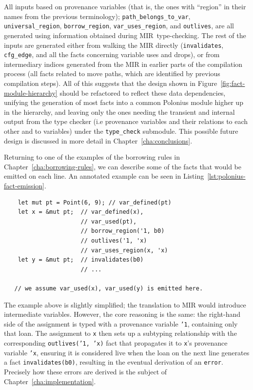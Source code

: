 \documentclass[11pt,a4paper,twoside,openany]{report}
\newenvironment{sourcecode}{\captionsetup{type=listing}}{}
\newcommand{\InRust}[1]{\texttt{#1}}
\newcommand{\InDatalog}[1]{\texttt{#1}}
\begin{document}
All inputs based on provenance variables (that is, the ones with ``region'' in
their names from the previous terminology); \texttt{path\_belongs\_to\_var},
\texttt{universal\_region}, \texttt{borrow\_region}, \texttt{var\_uses\_region},
and \texttt{outlives}, are all generated using information obtained during
MIR~type-checking. The rest of the inputs are generated either from walking the
MIR directly (\texttt{invalidates}, \texttt{cfg\_edge}, and all the facts
concerning variable uses and drops), or from intermediary indices generated from
the MIR in earlier parts of the compilation process (all facts related to move
paths, which are identified by previous compilation steps). All of this suggests
that the design shown in Figure~\ref{fig:fact-module-hierarchy} should be
refactored to reflect these data dependencies, unifying the generation of most
facts into a common Polonius module higher up in the hierarchy, and leaving only
the ones needing the transient and internal output from the type checker (i.e
provenance variables and their relations to each other and to variables) under
the \texttt{type\_check} submodule. This possible future design is discussed in
more detail in Chapter~\ref{cha:conclusions}.

Returning to one of the examples of the borrowing rules in
Chapter~\ref{cha:borrowing-rules}, we can describe some of the facts that would
be emitted on each line. An annotated example can be seen in
Listing~\ref{lst:polonius-fact-emission}.

\begin{sourcecode}
  \label{lst:polonius-fact-emission}
\begin{verbatim}
    let mut pt = Point(6, 9); // var_defined(pt)
    let x = &mut pt;  // var_defined(x),
                      // var_used(pt),
                      // borrow_region('1, b0)
                      // outlives('1, 'x)
                      // var_uses_region(x, 'x)
    let y = &mut pt;  // invalidates(b0)
                      // ...

   // we assume var_used(x), var_used(y) is emitted here.
\end{verbatim}
\end{sourcecode}

The example above is slightly simplified; the translation to MIR would introduce
intermediate variables. However, the core reasoning is the same: the right-hand
side of the assignment is typed with a provenance variable \InRust{'1},
containing only that loan. The assignment to \InRust{x} then sets up a subtyping
relationship with the corresponding \InDatalog{outlives('1, 'x)} fact that
propagates it to \InRust{x}'s provenance variable \InRust{'x}, ensuring it is
considered live when the loan on the next line generates a fact
\InRust{invalidates(b0)}, resulting in the eventual derivation of an
\InRust{error}. Precisely how these errors are derived is the subject of
Chapter~\ref{cha:implementation}.
\end{document}
